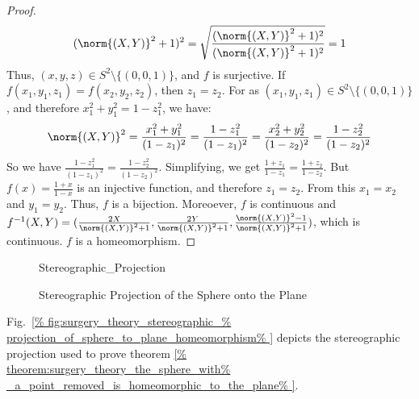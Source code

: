 \documentclass[crop=false,class=article,oneside]{standalone}
\begin{document}
\begin{proof}
\begin{align*}
{                    {(\norm{(X,Y)}^{2}+1)^{2}}
                }
                =\sqrt{
                    \frac{(\norm{(X,Y)}^{2}+1)^{2}}
                    {(\norm{(X,Y)}^{2}+1)^{2}}
                }
                =1
            \end{align*}
            Thus, $(x,y,z)\in S^{2}\setminus\{(0,0,1)\}$,
            and $f$ is surjective.
            If $f(x_{1},y_{1},z_{1})=f(x_{2},y_{2},z_{2})$,
            then $z_{1}=z_{2}$.
            For as
            $(x_{1},y_{1},z_{1})\in S^{2}\setminus\{(0,0,1)\}$,
            and therefore
            $x_{1}^{2}+y_{1}^{2}=1-z_{1}^{2}$, we have:
            \begin{equation*}
                \norm{(X,Y)}^{2}
                =\frac{x_{1}^2+y_{1}^2}{(1-z_{1})^{2}}
                =\frac{1-z_{1}^{2}}{(1-z_{1})^{2}}
                =\frac{x_{2}^{2}+y_{2}^{2}}{(1-z_{2})^{2}}
                =\frac{1-z_{2}^{2}}{(1-z_{2})^{2}}
            \end{equation*}
            So we have
            $\frac{1-z_{1}^{2}}{(1-z_{1})^{2}}%
             =\frac{1-z_{2}^{2}}{(1-z_{2})^{2}}$.
            Simplifying, we get
            $\frac{1+z_{1}}{1-z_{1}}=\frac{1+z_{2}}{1-z_{2}}$.
            But $f(x)=\frac{1+x}{1-x}$ is an injective function,
            and therefore $z_{1}=z_{2}$.
            From this $x_{1}=x_{2}$ and $y_{1}=y_{2}$.
            Thus, $f$ is a bijection. Moreoever,
            $f$ is continuous and $f^{-1}(X,Y)%
             =(\frac{2X}{\norm{(X,Y)}^{2}+1},%
               \frac{2Y}{\norm{(X,Y)}^{2}+1},%
               \frac{\norm{(X,Y)}^{2}-1}{\norm{(X,Y)}^{2}+1})$,
            which is continuous. $f$ is a homeomorphism.
        \end{proof}
        \begin{figure}[H]
            \captionsetup{type=figure}
            \centering
            {Stereographic_Projection}
            \caption[%
                Stereographic Projection%
            ]{%
                Stereographic Projection of the
                Sphere onto the Plane%
            }
            \label{%
                fig:surgery_theory_stereographic_%
                projection_of_sphere_to_plane_homeomorphism%
            }
        \end{figure}
        Fig.~\ref{%
            fig:surgery_theory_stereographic_%
            projection_of_sphere_to_plane_homeomorphism%
        }
        depicts the stereographic projection used
        to prove theorem
        \ref{%
            theorem:surgery_theory_the_sphere_with%
            _a_point_removed_is_homeomorphic_to_the_plane%
        }.
\end{document}
